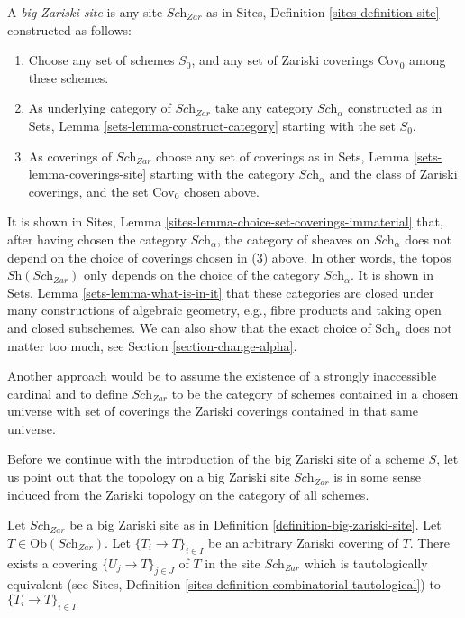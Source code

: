\begin{definition}
\label{definition-big-zariski-site}
A {\it big Zariski site} is any site $\textit{Sch}_{Zar}$ as in
Sites, Definition \ref{sites-definition-site} constructed as follows:
\begin{enumerate}
\item Choose any set of schemes $S_0$, and any set of Zariski coverings
$\text{Cov}_0$ among these schemes.
\item As underlying category of $\textit{Sch}_{Zar}$
take any category $\textit{Sch}_\alpha$ constructed as in
Sets, Lemma \ref{sets-lemma-construct-category} starting with the set $S_0$.
\item As coverings of $\textit{Sch}_{Zar}$ choose any set of coverings as in
Sets, Lemma \ref{sets-lemma-coverings-site} starting with the
category $\textit{Sch}_\alpha$ and the class of Zariski coverings,
and the set $\text{Cov}_0$ chosen above.
\end{enumerate}
\end{definition}

\noindent
It is shown in Sites, Lemma \ref{sites-lemma-choice-set-coverings-immaterial}
that, after having chosen the category $\textit{Sch}_\alpha$, the
category of sheaves on $\textit{Sch}_\alpha$ does not depend on the
choice of coverings chosen in (3) above. In other words, the topos
$\textit{Sh}(\textit{Sch}_{Zar})$ only depends on the choice of
the category $\textit{Sch}_\alpha$. It is shown in
Sets, Lemma \ref{sets-lemma-what-is-in-it} that these categories
are closed under many constructions of algebraic geometry, e.g.,
fibre products and taking open and closed subschemes. We can also show
that the exact choice of $\text{Sch}_\alpha$ does not matter
too much, see Section \ref{section-change-alpha}.

\medskip\noindent
Another approach would be to assume the existence of a
strongly inaccessible cardinal and to define $\textit{Sch}_{Zar}$
to be the category of schemes contained in a chosen universe with
set of coverings the Zariski coverings contained in that same
universe.

\medskip\noindent
Before we continue with the introduction of the big Zariski site of
a scheme $S$, let us point out that the topology on a big Zariski site
$\textit{Sch}_{Zar}$ is in some sense induced from the Zariski topology
on the category of all schemes.

\begin{lemma}
\label{lemma-zariski-induced}
Let $\textit{Sch}_{Zar}$ be a big Zariski site as in
Definition \ref{definition-big-zariski-site}.
Let $T \in \text{Ob}(\textit{Sch}_{Zar})$.
Let $\{T_i \to T\}_{i \in I}$ be an arbitrary Zariski covering of $T$.
There exists a covering $\{U_j \to T\}_{j \in J}$ of $T$ in the site
$\textit{Sch}_{Zar}$ which is tautologically equivalent (see
Sites, Definition \ref{sites-definition-combinatorial-tautological})
to $\{T_i \to T\}_{i \in I}$
\end{lemma}

